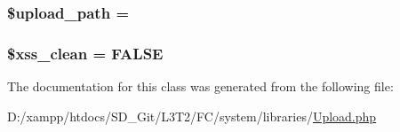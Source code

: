 \subsubsection[{\$upload\+\_\+path}]{\setlength{\rightskip}{0pt plus 5cm}\$upload\+\_\+path = \textquotesingle{}\textquotesingle{}}\label{class_c_i___upload_a38507bf82f955d4b13642a3c7fd6e773}
\hypertarget{class_c_i___upload_a0f2ee8861c0b3164a5c6e126dd98c0cc}{}
\subsubsection[{\$xss\+\_\+clean}]{\setlength{\rightskip}{0pt plus 5cm}\$xss\+\_\+clean = F\+A\+L\+S\+E}\label{class_c_i___upload_a0f2ee8861c0b3164a5c6e126dd98c0cc}


The documentation for this class was generated from the following file\+:\begin{DoxyCompactItemize}
\item 
D\+:/xampp/htdocs/\+S\+D\+\_\+\+Git/\+L3\+T2/\+F\+C/system/libraries/\hyperlink{_upload_8php}{Upload.\+php}\end{DoxyCompactItemize}
